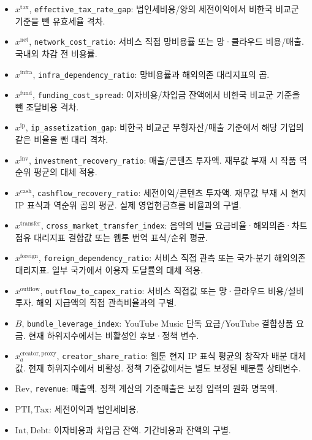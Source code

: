 \documentclass[11pt,a4paper]{report}
\begin{document}
\begin{itemize}[leftmargin=1.8em,itemsep=0.35em]
\item \(x^{\mathrm{tax}}\), \nolinkurl{effective_tax_rate_gap}: 법인세비용/양의 세전이익에서 비한국 비교군 기준을 뺀 유효세율 격차.
\item \(x^{\mathrm{net}}\), \nolinkurl{network_cost_ratio}: 서비스 직접 망비용률 또는 망·클라우드 비용/매출. 국내외 차감 전 비용률.
\item \(x^{\mathrm{infra}}\), \nolinkurl{infra_dependency_ratio}: 망비용률과 해외의존 대리지표의 곱.
\item \(x^{\mathrm{fund}}\), \nolinkurl{funding_cost_spread}: 이자비용/차입금 잔액에서 비한국 비교군 기준을 뺀 조달비용 격차.
\item \(x^{\mathrm{ip}}\), \nolinkurl{ip_assetization_gap}: 비한국 비교군 무형자산/매출 기준에서 해당 기업의 같은 비율을 뺀 대리 격차.
\item \(x^{\mathrm{inv}}\), \nolinkurl{investment_recovery_ratio}: 매출/콘텐츠 투자액. 재무값 부재 시 작품 역순위 평균의 대체 적용.
\item \(x^{\mathrm{cash}}\), \nolinkurl{cashflow_recovery_ratio}: 세전이익/콘텐츠 투자액. 재무값 부재 시 현지 IP 표식과 역순위 곱의 평균. 실제 영업현금흐름 비율과의 구별.
\item \(x^{\mathrm{transfer}}\), \nolinkurl{cross_market_transfer_index}: 음악의 번들 요금비율·해외의존·차트 점유 대리지표 결합값 또는 웹툰 번역 표식/순위 평균.
\item \(x^{\mathrm{foreign}}\), \nolinkurl{foreign_dependency_ratio}: 서비스 직접 관측 또는 국가-분기 해외의존 대리지표. 일부 국가에서 이용자 도달률의 대체 적용.
\item \(x^{\mathrm{outflow}}\), \nolinkurl{outflow_to_capex_ratio}: 서비스 직접값 또는 망·클라우드 비용/설비투자. 해외 지급액의 직접 관측비율과의 구별.
\item \(B\), \nolinkurl{bundle_leverage_index}: YouTube Music 단독 요금/YouTube 결합상품 요금. 현재 하위지수에서는 비활성인 후보·정책 변수.
\item \(x^{\mathrm{creator,proxy}}_a\), \nolinkurl{creator_share_ratio}: 웹툰 현지 IP 표식 평균의 창작자 배분 대체값. 현재 하위지수에서 비활성. 정책 기준값에서는 별도 보정된 배분률 상태변수.
\item \(\mathrm{Rev}\), \nolinkurl{revenue}: 매출액. 정책 계산의 기준매출은 보정 입력의 원화 명목액.
\item \(\mathrm{PTI},\mathrm{Tax}\): 세전이익과 법인세비용.
\item \(\mathrm{Int},\mathrm{Debt}\): 이자비용과 차입금 잔액. 기간비용과 잔액의 구별.

\end{itemize}
\end{document}
